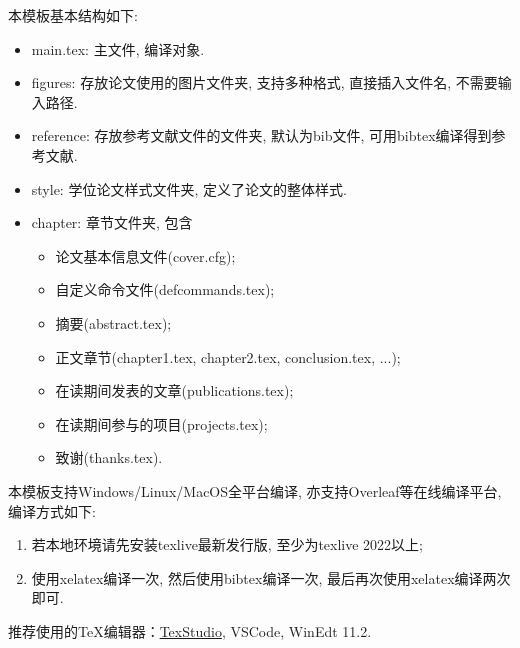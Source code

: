 \label{chapter:Introduction}


本模板基本结构如下:

\begin{itemize}
\item main.tex: 主文件, 编译对象.
\item figures: 存放论文使用的图片文件夹, 支持多种格式, 直接插入文件名, 不需要输入路径.
\item reference: 存放参考文献文件的文件夹, 默认为bib文件, 可用bibtex编译得到参考文献.
\item style: 学位论文样式文件夹, 定义了论文的整体样式.
\item chapter: 章节文件夹, 包含
\begin{itemize}
\item 论文基本信息文件(cover.cfg);
\item 自定义命令文件(defcommands.tex);
\item 摘要(abstract.tex);
\item 正文章节(chapter1.tex, chapter2.tex, conclusion.tex, ...);
\item 在读期间发表的文章(publications.tex);
\item 在读期间参与的项目(projects.tex);
\item 致谢(thanks.tex).
\end{itemize}
\end{itemize}

本模板支持Windows/Linux/MacOS全平台编译, 亦支持Overleaf等在线编译平台, 编译方式如下:
\begin{enumerate}
\item 若本地环境请先安装texlive最新发行版, 至少为texlive 2022以上; 
\item 使用xelatex编译一次, 然后使用bibtex编译一次, 最后再次使用xelatex编译两次即可.
\end{enumerate}
推荐使用的TeX编辑器：\href{https://mirrors.tuna.tsinghua.edu.cn/github-release/texstudio-org/texstudio/}{TexStudio}, VSCode, WinEdt 11.2.

